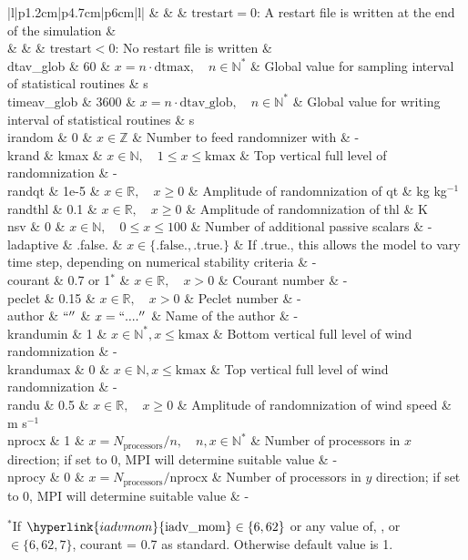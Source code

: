\documentclass[twoside,11pt,fleqn,a4paper,english,openright]{report}
\begin{document}
\begin{center}
\begin{supertabular}{|l|p{1.2cm}|p{4.7cm}|p{6cm}|l|}
  	& & & $\text{trestart}=0$: A restart file is written at the end of the simulation & \\
  	& & & $\text{trestart}<0$: No restart file is written  & \\
  dtav\_glob	& 60		& $x = n \cdot \text{dtmax}, \quad n \in \mathbb{N}^*$		& Global value for sampling interval of statistical routines	& s\\
  timeav\_glob	& 3600		& $x = n \cdot \text{dtav\_glob}, \quad n \in \mathbb{N}^*$	& Global value for writing interval of statistical routines	& s\\
  irandom	& 0		& $x \in \mathbb{Z}$			& Number to feed randomnizer with		& -\\
  krand		& kmax		& $x \in \mathbb{N}, \quad 1 \leq x \leq \text{kmax}$		& Top vertical full level of randomnization 	& -\\
  randqt	& 1e-5		& $x \in \mathbb{R}, \quad x\geq 0$		& Amplitude of randomnization of qt		& kg kg$^{-1}$\\
  randthl	& 0.1		& $x \in \mathbb{R}, \quad x \geq 0$		& Amplitude of randomnization of thl		& K\\
  nsv		& 0		& $x \in \mathbb{N}, \quad 0 \leq x \leq 100$	& Number of additional passive scalars		& -\\
  ladaptive	& .false.	& $x\in\{\text{.false.},\text{.true.}\}$		& If .true., this allows the model to vary time step, depending on numerical stability criteria				& -\\
  courant	& 0.7 or 1$^*$	& $x \in \mathbb{R}, \quad x>0$		& Courant number				& -\\
  peclet	& 0.15 & $x \in \mathbb{R}, \quad x>0$		& Peclet number					& -\\	
  author	& $``''$	& $x = ``....''$	& Name of the author & -\\
  krandumin	& 1		& $x \in \mathbb{N}^*, x \leq \text{kmax}$	& Bottom vertical full level of wind randomnization 	& -\\
  krandumax	& 0		& $x \in \mathbb{N},  x \leq \text{kmax}$	& Top vertical full level of wind randomnization 	& -\\
  randu		& 0.5		& $x \in \mathbb{R}, \quad x \geq 0$		& Amplitude of randomnization of wind speed 	& m s$^{-1}$\\
  \hypertarget{nprocx}{nprocx}	& 1	& $x = N_{\text{processors}} / n, \quad n,x \in \mathbb{N}^*$	& Number of processors in $x$ direction; if set to 0, MPI will determine suitable value	& - \\
  \hypertarget{nprocy}{nprocy}	& 0	& $x = N_{\text{processors}} / \text{nprocx}$	& Number of processors in $y$ direction; if set to 0, MPI will determine suitable value	& - \\
\end{supertabular}
$^*$If $\hyperlink{iadvmom}{\text{iadv\_mom}} \in \lbrace6, 62\rbrace$ or any value of\hyperlink{iadvtke}{}, \hyperlink{iadvthl}{}, \hyperlink{iadvqt}{} or \hyperlink{iadvsv}{} $\in \lbrace6, 62, 7\rbrace$, courant = 0.7 as standard. Otherwise default value is 1.
\end{center}
\end{document}

